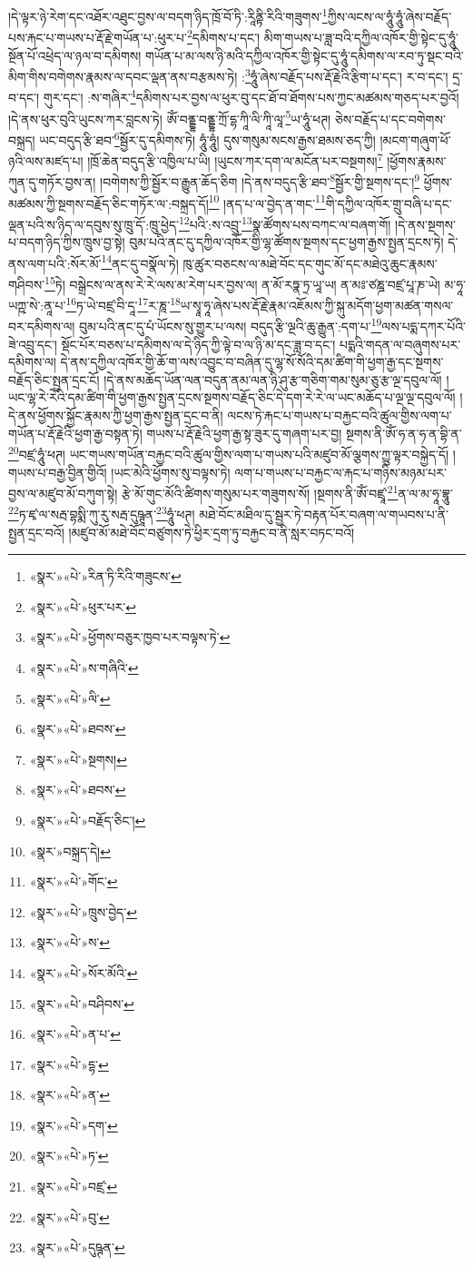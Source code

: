 །དེ་ལྟར་ཉེ་རེག་དང་འཐོར་འཐུང་བྱས་ལ་བདག་ཉིད་ཁྲོ་བོ་ཏི་:རཱིནྟི་རིའི་གཟུགས་\footnote{«སྣར་»«པེ་»རིན་ཏི་རིའི་གཟུངས་}ཀྱིས་ལངས་ལ་ཧཱུཾ་ཧཱུཾ་ཞེས་བརྗོད་པས་རྐང་པ་གཡས་པ་རྡོ་རྗེ་གཡོན་པ་:ཕུར་པ་\footnote{«སྣར་»«པེ་»ཕུར་པར་}དམིགས་པ་དང་། མིག་གཡས་པ་ཟླ་བའི་དཀྱིལ་འཁོར་གྱི་སྟེང་དུ་ཧཱུཾ་སྔོན་པོ་འཕྲེད་ལ་ཉལ་བ་དམིགས། གཡོན་པ་མ་ལས་ཉི་མའི་དཀྱིལ་འཁོར་གྱི་སྟེང་དུ་ཧཱུཾ་དམིགས་ལ་རབ་ཏུ་སྡང་བའི་མིག་གིས་བགེགས་རྣམས་ལ་དབང་ལྡན་ནས་བརྩམས་ཏེ། :\footnote{«སྣར་»«པེ་»ཕྱོགས་བཅུར་ཁྱབ་པར་བལྟས་ཏེ་}ཧཱུཾ་ཞེས་བརྗོད་པས་རྡོ་རྗེའི་རྩིག་པ་དང་། ར་བ་དང་། དྲ་བ་དང་། གུར་དང་། :ས་གཞིར་\footnote{«སྣར་»«པེ་»ས་གཞིའི་}དམིགས་པར་བྱས་ལ་ཕུར་བུ་དང་ཐོ་བ་ཐོགས་པས་ཀྱང་མཚམས་གཅད་པར་བྱའོ། །དེ་ནས་ཕུར་བུའི་ཡུངས་ཀར་བླངས་ཏེ། ཨོཾ་བནྡྷ་བནྡྷ་ཀྲོ་དྷ་ཀཱི་ལི་ཀཱི་ལཱ་\footnote{«སྣར་»«པེ་»ལི་}ཡ་ཧཱུཾ་ཕཊ། ཅེས་བརྗོད་པ་དང་བགེགས་བསྐྲད། ཡང་བདུད་རྩི་ཐབ་\footnote{«སྣར་»«པེ་»ཐབས་}སྦྱོར་དུ་དམིགས་ཏེ། ཧཱུཾ་ཧཱུཾ། དུས་གསུམ་སངས་རྒྱས་ཐམས་ཅད་ཀྱི། །མངག་གཞུག་ཕོ་ཉའི་ལས་མཛད་པ། །ཁྲོ་ཆེན་བདུད་རྩི་འཁྱིལ་པ་ཡི། །ཡུངས་ཀར་དག་ལ་མངོན་པར་བསྔགས།\footnote{«སྣར་»«པེ་»སྔགས།} །ཕྱོགས་རྣམས་ཀུན་དུ་གཏོར་བྱས་ན། །བགེགས་ཀྱི་སྦྱོར་བ་རྒྱུན་ཆོད་ཅིག །དེ་ནས་བདུད་རྩི་ཐབ་\footnote{«སྣར་»«པེ་»ཐབས་}སྦྱོར་གྱི་སྔགས་དང་།\footnote{«སྣར་»«པེ་»བརྗོད་ཅིང་།} ཕྱོགས་མཚམས་ཀྱི་སྔགས་བརྗོད་ཅིང་གཏོར་ལ་:བསྐྲད་དོ།\footnote{«སྣར་»བསྐྲད་དེ།} །ནད་པ་ལ་བྱེད་ན་གང་\footnote{«སྣར་»«པེ་»གོང་}གི་དཀྱིལ་འཁོར་གྲུ་བཞི་པ་དང་ལྡན་པའི་ས་ཉིད་ལ་དབུས་སུ་ཁྲུ་དོ་:ཁྲུ་ཕྱེད་\footnote{«སྣར་»«པེ་»ཁྲུས་བྱེད་}པའི་:ས་འབྲུ་\footnote{«སྣར་»«པེ་»ས་}སྣ་ཚོགས་པས་བཀང་ལ་བཞག་གོ། །དེ་ནས་སྔགས་པ་བདག་ཉིད་ཀྱིས་ཁྲུས་བྱ་སྟེ། བུམ་པའི་ནང་དུ་དཀྱིལ་འཁོར་གྱི་ལྷ་ཚོགས་སྔགས་དང་ཕྱག་རྒྱས་སྤྱན་དྲངས་ཏེ། དེ་ནས་ལག་པའི་:སོར་མོ་\footnote{«སྣར་»«པེ་»སོར་མོའི་}ནང་དུ་བསྣོལ་ཏེ། ཁུ་ཚུར་བཅངས་ལ་མཐེ་བོང་དང་གུང་མོ་དང་མཐེའུ་ཆུང་རྣམས་གཤིབས་\footnote{«སྣར་»«པེ་»བཤིབས་}ཏེ། བསྒྲེངས་ལ་ནས་རེ་རེ་ལས་མ་རེག་པར་བྱས་ལ། ན་མོ་རཏྣ་ཏྲ་ཡཱ་ཡ། ན་མཿ་ཙཎྜ་བཛྲ་པཱ་ཎ་ཡེ། མ་ཧཱ་ཡཀྵ་སེ་:ནཱ་པ་\footnote{«སྣར་»«པེ་»ན་པ་}ཏ་ཡེ་བཛྲ་བི་དཱ་\footnote{«སྣར་»«པེ་»དྷ་}ར་ཎཱ་\footnote{«སྣར་»«པེ་»ན་}ཡ་སྭཱ་ཧཱ་ཞེས་པས་རྡོ་རྗེ་རྣམ་འཇོམས་ཀྱི་སྐུ་མདོག་ཕྱག་མཚན་གསལ་བར་དམིགས་ལ། བུམ་པའི་ནང་དུ་པཾ་ཡོངས་སུ་གྱུར་པ་ལས། བདུད་རྩི་ལྔའི་ཆུ་རྒྱུན་:དག་པ་\footnote{«སྣར་»«པེ་»དག་}ལས་པདྨ་དཀར་པོའི་ཟེ་འབྲུ་དང་། སྡོང་པོར་བཅས་པ་དམིགས་ལ་དེ་ཉིད་ཀྱི་ལྟེ་བ་ལ་ཉི་མ་དང་ཟླ་བ་དང་། པདྨའི་གདན་ལ་བཞུགས་པར་དམིགས་ལ། དེ་ནས་དཀྱིལ་འཁོར་གྱི་ཆོ་ག་ལས་འབྱུང་བ་བཞིན་དུ་ལྷ་སོ་སོའི་དམ་ཚིག་གི་ཕྱག་རྒྱ་དང་སྔགས་བརྗོད་ཅིང་སྤྱན་དྲང་ངོ། །དེ་ནས་མཆོད་ཡོན་ལན་བདུན་ནམ་ལན་ཉི་ཤུ་རྩ་གཅིག་གམ་སུམ་ཅུ་རྩ་ལྔ་དབུལ་ལོ། །ཡང་ལྷ་རེ་རེའི་དམ་ཚིག་གི་ཕྱག་རྒྱས་སྤྱན་དྲངས་སྔགས་བརྗོད་ཅིང་དེ་དག་རེ་རེ་ལ་ཡང་མཆོད་པ་ལྔ་ལྔ་དབུལ་ལོ། །དེ་ནས་ཕྱོགས་སྐྱོང་རྣམས་ཀྱི་ཕྱག་རྒྱས་སྤྱན་དྲང་བ་ནི། ལངས་ཏེ་རྐང་པ་གཡས་པ་བརྐྱང་བའི་ཚུལ་གྱིས་ལག་པ་གཡོན་པ་རྡོ་རྗེའི་ཕྱག་རྒྱ་བསྟན་ཏེ། གཡས་པ་རྡོ་རྗེའི་ཕྱག་རྒྱ་སྟ་ཟུར་དུ་གཞག་པར་བྱ། སྔགས་ནི་ཨོཾ་ཧ་ན་ཧ་ན་བྷི་ན་\footnote{«སྣར་»«པེ་»ཏ་}བཛྲ་ཧཱུཾ་ཕཊ། ཡང་གཡས་གཡོན་བརྐྱང་བའི་ཚུལ་གྱིས་ལག་པ་གཡས་པའི་མཛུབ་མོ་ལྕགས་ཀྱུ་ལྟར་བསྐྱེད་དོ། །གཡས་པ་བརྒྱ་བྱིན་གྱིའོ། །ཡང་མེའི་ཕྱོགས་སུ་བལྟས་ཏེ། ལག་པ་གཡས་པ་བརྐྱང་ལ་རྐང་པ་གཉིས་མཉམ་པར་བྱས་ལ་མཛུབ་མོ་བཀུག་སྟེ། རྩེ་མོ་གུང་མོའི་ཚིགས་གསུམ་པར་གཟུགས་སོ། །སྔགས་ནི་ཨོཾ་བཛྲཱ་\footnote{«སྣར་»«པེ་»བཛྲ་}ན་ལ་མ་ཧཱ་བྷཱུ་\footnote{«སྣར་»«པེ་»བུ་}ཏ་ཛྭ་ལ་སརྦ་བྷསྨི་ཀུ་རུ་སརྦ་དུཥྚཱན་\footnote{«སྣར་»«པེ་»དུཥྚན་}ཧཱུཾ་ཕཊ། མཐེ་བོང་མཐིལ་དུ་སྦྱར་ཏེ་བརྟན་པོར་བཞག་ལ་གཡབས་པ་ནི་སྤྱན་དྲང་བའོ། །མཛུབ་མོ་མཐེ་བོང་བཙུགས་ཏེ་ཕྱིར་དྲག་ཏུ་བརྐྱང་བ་ནི་སླར་བཏང་བའོ། 